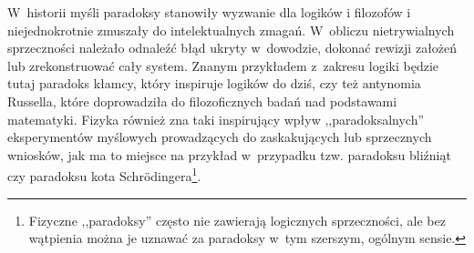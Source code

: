 W~historii myśli paradoksy stanowiły wyzwanie dla logików i filozofów i niejednokrotnie zmuszały do intelektualnych zmagań. W~obliczu nietrywialnych sprzeczności należało odnaleźć błąd ukryty w~dowodzie, dokonać rewizji założeń lub zrekonstruować cały system. Znanym przykładem z~zakresu logiki będzie tutaj paradoks kłamcy, który inspiruje logików do dziś, czy też antynomia Russella, które doprowadziła do filozoficznych badań nad podstawami matematyki. Fizyka również zna taki inspirujący wpływ ,,paradoksalnych'' eksperymentów myślowych prowadzących do zaskakujących lub sprzecznych wniosków, jak ma to miejsce na przykład w~przypadku tzw. paradoksu bliźniąt czy paradoksu kota Schrödingera\footnote{Fizyczne ,,paradoksy'' często nie zawierają logicznych sprzeczności, ale bez wątpienia można je uznawać za paradoksy w~tym szerszym, ogólnym sensie.}.

